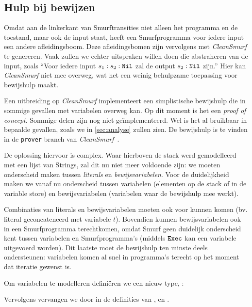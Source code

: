 \subsection{Hulp bij bewijzen}
\label{sec:cleansmurf:proofs}

Omdat aan de linkerkant van Smurftransities niet alleen het programma en de
toestand, maar ook de input staat, heeft een Smurfprogramma voor iedere input
een andere afleidingsboom. Deze afleidingsbomen zijn vervolgens met
\emph{CleanSmurf} te genereren. Vaak zullen we echter uitspraken willen doen
die abstraheren van de input, zoals ``Voor iedere input $s_1:s_2:\texttt{Nil}$ zal de
output $s_2:\texttt{Nil}$ zijn.'' Hier kan \emph{CleanSmurf} niet mee overweg, wat het
een weinig behulpzame toepassing voor bewijshulp maakt.

Een uitbreiding op \emph{CleanSmurf} implementeert een simplistische bewijshulp
die in sommige gevallen met variabelen overweg kan. Op dit moment is het een
\emph{proof of concept}. Sommige delen zijn nog niet geïmplementeerd. Wel is
het al bruikbaar in bepaalde gevallen, zoals we in \autoref{sec:analyse} zullen
zien. De bewijshulp is te vinden in de \texttt{prover} branch van
\emph{CleanSmurf}~\cite{cleansmurf}.

De oplossing hiervoor is complex. Waar hierboven de stack werd gemodelleerd met
een lijst van Strings, zal dit nu niet meer voldoende zijn: we moeten
onderscheid maken tussen \emph{literals} en \emph{bewijsvariabelen}. Voor de
duidelijkheid maken we vanaf nu onderscheid tussen variabelen (elementen op de
stack of in de variable store) en bewijsvariabelen (variabelen waar de
bewijshulp mee werkt).

Combinaties van literals en bewijsvariabelen moeten ook voor kunnen komen (bv.
literal  geconcateneerd met variabele $t$). Bovendien kunnen
bewijsvariabelen ook in een Smurfprogramma terechtkomen, omdat Smurf geen
duidelijk onderscheid kent tussen variabelen en Smurfprogramma's (middels
$\texttt{Exec}$ kan een variabele uitgevoerd worden). Dit laatste moet de bewijshulp
ten minste deels ondersteunen: variabelen komen al snel in programma's terecht
op het moment dat iteratie gewenst is.

Om variabelen te modelleren definiëren we een nieuw type, :



Vervolgens vervangen we  door  in de definities van
,  en .

